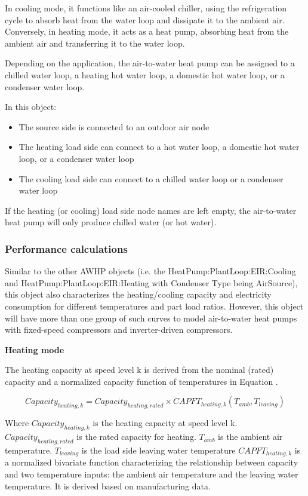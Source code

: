 In cooling mode, it functions like an air-cooled chiller, using the
refrigeration cycle to absorb heat from the water loop and dissipate it to the
ambient air. Conversely, in heating mode, it acts as a heat pump, absorbing heat
from the ambient air and transferring it to the water loop.

Depending on the application, the air-to-water heat pump can be assigned to a
chilled water loop, a heating hot water loop, a domestic hot water loop, or a
condenser water loop.

In this object:
\begin{itemize}
\item The source side is connected to an outdoor air node
\item The heating load side can connect to a hot water loop, a domestic hot water loop, or a condenser water loop
\item The cooling load side can connect to a chilled water loop or a condenser water loop
\end{itemize}

If the heating (or cooling) load side node names are left empty, the
air-to-water heat pump will only produce chilled water (or hot water).

\subsubsection{Performance calculations}

Similar to the other AWHP objects (i.e. the HeatPump:PlantLoop:EIR:Cooling and
HeatPump:PlantLoop:EIR:Heating with Condenser Type being AirSource), this object
also characterizes the heating/cooling capacity and electricity consumption for
different temperatures and part load ratios. However, this object will have more
than one group of such curves to model air-to-water heat pumps with fixed-speed
compressors and inverter-driven compressors.

\noindent\textbf{Heating mode}

The heating capacity at speed level k is derived from the nominal (rated)
capacity and a normalized capacity function of temperatures in Equation .

\begin{equation}
Capacity_{heating,k}=Capacity_{heating,rated} \times CAPFT_{heating,k}(T_{amb},T_{leaving})	                 
\end{equation}

Where $Capacity_{heating,k}$ is the heating capacity at speed level k.
$Capacity_{heating,rated}$ is the rated capacity for heating. $T_{amb}$ is the ambient air
temperature. $T_{leaving}$ is the load side leaving water temperature $CAPFT_{heating,k}$
is a normalized bivariate function characterizing the relationship between
capacity and two temperature inputs: the ambient air temperature and the leaving
water temperature. It is derived based on manufacturing data.

